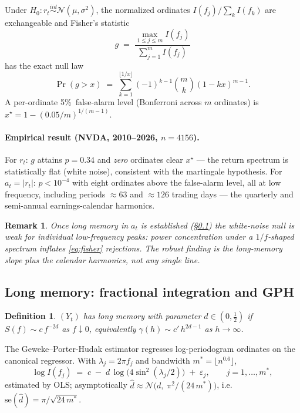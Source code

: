 \documentclass[11pt,a4paper]{article}
\newtheorem{definition}[theorem]{Definition}
\newtheorem{remark}[theorem]{Remark}
\begin{document}
Under $H_0\colon r_t \overset{iid}{\sim}\mathcal N(\mu,\sigma^2)$, the normalized
ordinates $I(f_j)/\sum_{k}I(f_k)$ are exchangeable and Fisher's statistic
\begin{equation}
g \;=\; \frac{\max_{1\le j\le m} I(f_j)}{\sum_{j=1}^{m} I(f_j)}
\end{equation}
has the exact null law
\begin{equation}
\Pr(g > x) \;=\; \sum_{k=1}^{\lfloor 1/x \rfloor} (-1)^{k-1}\binom{m}{k}(1-kx)^{m-1}.
\label{eq:fisher}
\end{equation}
A per-ordinate 5\%\ false-alarm level (Bonferroni across $m$ ordinates) is
$x^\star = 1-(0.05/m)^{1/(m-1)}$.

\paragraph{Empirical result (NVDA, 2010--2026, $n=4156$).} For $r_t$:
$g$ attains $p=0.34$ and \emph{zero} ordinates clear $x^\star$ --- the return
spectrum is statistically flat (white noise), consistent with the martingale
hypothesis. For $a_t=|r_t|$: $p<10^{-4}$ with eight ordinates above the
false-alarm level, all at low frequency, including periods $\approx 63$ and
$\approx 126$ trading days --- the quarterly and semi-annual earnings-calendar
harmonics.

\begin{remark}
Once long memory in $a_t$ is established (\S\ref{sec:longmem}) the white-noise
null is weak for individual low-frequency peaks: power concentration under a
$1/f$-shaped spectrum inflates \eqref{eq:fisher} rejections. The robust finding
is the long-memory slope plus the calendar harmonics, not any single line.
\end{remark}

\subsection{Long memory: fractional integration and GPH}\label{sec:longmem}

\begin{definition}
$(Y_t)$ has long memory with parameter $d\in(0,\tfrac12)$ if
$S(f)\sim c\, f^{-2d}$ as $f\downarrow 0$, equivalently
$\gamma(h)\sim c'\, h^{2d-1}$ as $h\to\infty$.
\end{definition}

The Geweke--Porter-Hudak estimator regresses log-periodogram ordinates on the
canonical regressor. With $\lambda_j = 2\pi f_j$ and bandwidth
$m^\ast=\lfloor n^{0.6}\rfloor$,
\begin{equation}
\log I(f_j) \;=\; c \;-\; d\,\log\!\bigl(4\sin^2(\lambda_j/2)\bigr) \;+\;
\varepsilon_j, \qquad j=1,\dots,m^\ast,
\end{equation}
estimated by OLS; asymptotically
$\hat d \approx \mathcal N\!\bigl(d,\; \pi^2/(24\,m^\ast)\bigr)$, i.e.\
$\mathrm{se}(\hat d)=\pi/\sqrt{24\,m^\ast}$.
\end{document}
